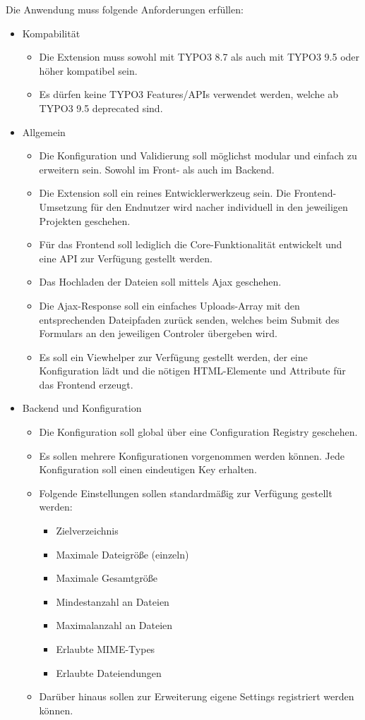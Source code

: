 Die Anwendung muss folgende Anforderungen erfüllen: 
\begin{itemize}[itemsep=0em,partopsep=0em,parsep=0em,topsep=0em]
\item Kompabilität
	\begin{itemize}
		\item Die Extension muss sowohl mit TYPO3 8.7 als auch mit TYPO3 9.5 oder höher kompatibel sein.
		\item Es dürfen keine TYPO3 Features/APIs verwendet werden, welche ab TYPO3 9.5 deprecated sind.
	\end{itemize}
\item Allgemein
	\begin{itemize}
		\item Die Konfiguration und Validierung soll möglichst modular und einfach zu erweitern sein. Sowohl im Front- als auch im Backend.
		\item Die Extension soll ein reines Entwicklerwerkzeug sein. Die Frontend-Umsetzung für den Endnutzer wird nacher individuell in den jeweiligen Projekten geschehen.
		\item Für das Frontend soll lediglich die Core-Funktionalität entwickelt und eine API zur Verfügung gestellt werden.
		\item Das Hochladen der Dateien soll mittels Ajax geschehen.
		\item Die Ajax-Response soll ein einfaches Uploads-Array mit den entsprechenden Dateipfaden zurück senden, welches beim Submit des Formulars an den jeweiligen Controler übergeben wird.
		\item Es soll ein Viewhelper zur Verfügung gestellt werden, der eine Konfiguration lädt und die nötigen HTML-Elemente und Attribute für das Frontend erzeugt.
	\end{itemize}
\item Backend und Konfiguration
	\begin{itemize}
		\item Die Konfiguration soll global über eine Configuration Registry geschehen.
		\item Es sollen mehrere Konfigurationen vorgenommen werden können. Jede Konfiguration soll einen eindeutigen Key erhalten.
		\item Folgende Einstellungen sollen standardmäßig zur Verfügung gestellt werden:
			\begin{itemize}
				\item Zielverzeichnis
				\item Maximale Dateigröße (einzeln)
				\item Maximale Gesamtgröße
				\item Mindestanzahl an Dateien
				\item Maximalanzahl an Dateien
				\item Erlaubte MIME-Types
				\item Erlaubte Dateiendungen
			\end{itemize}
		\item Darüber hinaus sollen zur Erweiterung eigene Settings registriert werden können. 
	\end{itemize}
\end{itemize}